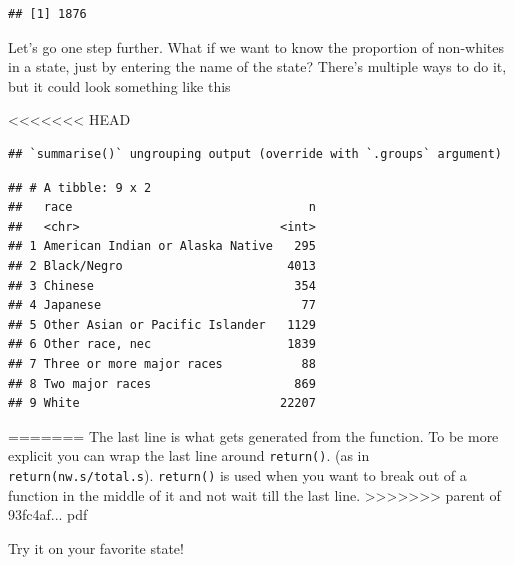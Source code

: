 \documentclass[]{book}
\newenvironment{Shaded}{\begin{snugshade}}{\end{snugshade}}
\newcommand{\ControlFlowTok}[1]{\textcolor[rgb]{0.13,0.29,0.53}{\textbf{#1}}}
\newcommand{\KeywordTok}[1]{\textcolor[rgb]{0.13,0.29,0.53}{\textbf{#1}}}
\newcommand{\NormalTok}[1]{#1}
\newcommand{\OperatorTok}[1]{\textcolor[rgb]{0.81,0.36,0.00}{\textbf{#1}}}
\newcommand{\StringTok}[1]{\textcolor[rgb]{0.31,0.60,0.02}{#1}}
\theoremstyle{definition}
\theoremstyle{definition}
\theoremstyle{definition}
\theoremstyle{remark}
\begin{document}
\begin{Shaded}
\begin{Highlighting}[]
\begin{Shaded}
\begin{Highlighting}[]
\begin{Shaded}
\begin{Highlighting}[]
\begin{verbatim}
## [1] 1876
\end{verbatim}

Let's go one step further. What if we want to know the proportion of non-whites in a state, just by entering the name of the state? There's multiple ways to do it, but it could look something like this

\begin{Shaded}
\end{Shaded}

<<<<<<< HEAD
\begin{verbatim}
## `summarise()` ungrouping output (override with `.groups` argument)
\end{verbatim}

\begin{verbatim}
## # A tibble: 9 x 2
##   race                                 n
##   <chr>                            <int>
## 1 American Indian or Alaska Native   295
## 2 Black/Negro                       4013
## 3 Chinese                            354
## 4 Japanese                            77
## 5 Other Asian or Pacific Islander   1129
## 6 Other race, nec                   1839
## 7 Three or more major races           88
## 8 Two major races                    869
## 9 White                            22207
\end{verbatim}
=======
The last line is what gets generated from the function. To be more explicit you can wrap the last line around \texttt{return()}. (as in \texttt{return(nw.s/total.s}). \texttt{return()} is used when you want to break out of a function in the middle of it and not wait till the last line.
>>>>>>> parent of 93fc4af... pdf

Try it on your favorite state!


\end{Highlighting}
\end{Shaded}
\end{Highlighting}
\end{Shaded}
\end{Highlighting}
\end{Shaded}
\end{document}
